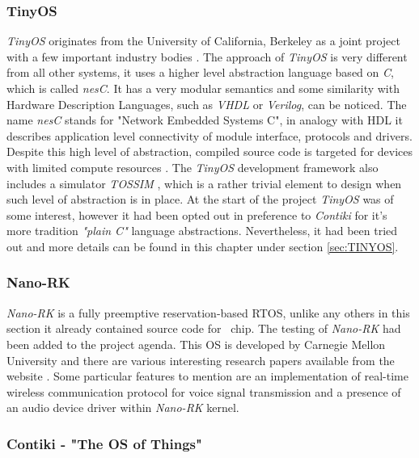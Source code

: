 \subsubsection{TinyOS} \label{sec:rtos:tinyos}

 \emph{TinyOS} originates from the University of California, Berkeley as a joint
 project with a few important industry bodies \cite{links:tinyos:webs,
 links:tinyos:homepage}. The approach of \emph{TinyOS} is very different from all
 other systems, it uses a higher level abstraction language based on \emph{C},
 which is called \emph{nesC}. It has a very modular semantics and some similarity
 with Hardware Description Languages, such as \emph{VHDL} or \emph{Verilog}, can
 be noticed. The name \emph{nesC} stands for "Network Embedded Systems C", in
 analogy with HDL it describes application level connectivity of module interface,
 protocols and drivers. Despite this high level of abstraction, compiled source
 code is targeted for devices with limited compute resources \cite{links:tinyos:nesc}.
 The \emph{TinyOS} development framework also includes a simulator \emph{TOSSIM}
 \cite{links:tinyos:tossim}, which is a rather trivial element to design when
 such level of abstraction is in place. At the start of the project \emph{TinyOS}
 was of some interest, however it had been opted out in preference to \emph{Contiki}
 for it's more tradition \emph{"plain C"} language abstractions. Nevertheless,
 it had been tried out and more details can be found in this chapter under section
 \ref{sec:TINYOS}.


\subsubsection{Nano-RK} \label{sec:rtos:nanork}

 \emph{Nano-RK} is a fully preemptive reservation-based RTOS, unlike
 any others in this section it already contained source code for \RFA\
 chip. The testing of \emph{Nano-RK} had been added to the project agenda.
 This OS is developed by Carnegie Mellon University and there are various
 interesting research papers available from the website
 \cite{links:nanork:pubs, pubs:nrk07, pubs:nrk06b, pubs:nrk06a}.
 Some particular features to mention are an implementation of real-time
 wireless communication protocol for voice signal transmission \cite{pubs:nrk06a}
 and a presence of an audio device driver within \emph{Nano-RK} kernel.


\subsubsection{Contiki - "The OS of Things"} \label{sec:rtos:contiki}

